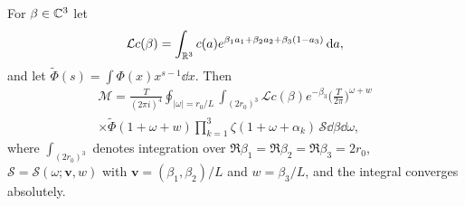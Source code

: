 \documentclass[11pt,colorlinks]{charlie}
\begin{document}
\begin{lemma}\label{lem:balpoisson}
For $\beta\in\mathbb{C}^3$ let
\[
 \mathcal Lc(\beta)=\int_{\mathbb{R}^3}c(a)e^{\beta_1a_1+\beta_2a_2+\beta_3(1-a_3)}\,\mathrm{d} a,
\]
and let $\widetilde\Phi(s)=\int\Phi(x)x^{s-1}\dd x$. Then
\begin{multline*}
 \mathcal M=\frac T{(2\pi i)^4}\oint_{|\omega|=r_0/L}\int_{(2r_0)^3}\mathcal Lc(\beta)e^{-\beta_3}\Big(\frac T{2\pi}\Big)^{\omega+w}\\
 \times\widetilde\Phi(1+\omega+w)\prod_{k=1}^3\zeta(1+\omega+\alpha_k)\,\mathcal S\dd\beta\dd\omega,
\end{multline*}
where $\int_{(2r_0)^3}$ denotes integration over $\Re\beta_1=\Re\beta_2=\Re\beta_3=2r_0$, $\mathcal S=\mathcal S(\omega;\boldsymbol v,w)$ with $\boldsymbol v=(\beta_1,\beta_2)/L$ and $w=\beta_3/L$, and the integral converges absolutely.
\end{lemma}
\end{document}
